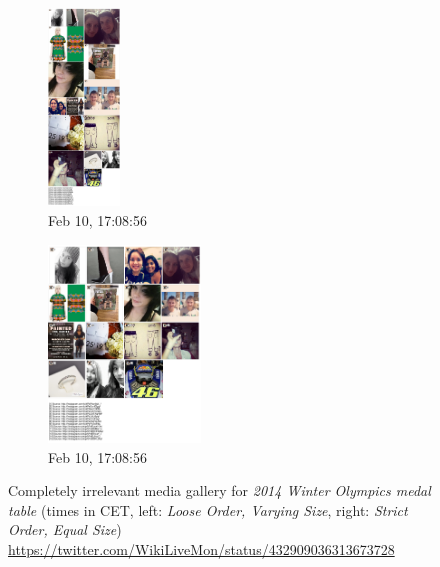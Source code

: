 \documentclass{sig-alternate-somus}
\newcommand{\inlinelistingsize}{\fontsize{8pt}{11pt}}
\let\oldurl\url
\renewcommand{\url}[1]{\inlinelistingsize\oldurl{#1}}
\begin{document}
\begin{figure}[p!]
  \centering
  \begin{subfigure}[t]{0.25\textwidth}
    \includegraphics[height=5.25cm]{figures/medal_table/mediagallery_looseOrder_1392048536608.png}
    \caption{Feb 10, 17:08:56}
    \label{fig:1392048536608}
  \end{subfigure}%
  \begin{subfigure}[t]{0.25\textwidth}
    \includegraphics[height=5.25cm]{figures/medal_table/mediagallery_strictOrder_1392048536209.png}
    \caption{Feb 10, 17:08:56}
    \label{fig:1392048536209}
  \end{subfigure}
  \caption{Completely irrelevant media gallery for
    \emph{2014 Winter Olympics medal table}
    (times in CET, left: \emph{Loose Order, Varying Size},
    right: \emph{Strict Order, Equal Size})    
    \url{https://twitter.com/WikiLiveMon/status/432909036313673728}}
  \label{fig:medal-table}
\end{figure}



\balancecolumns
\end{document}
